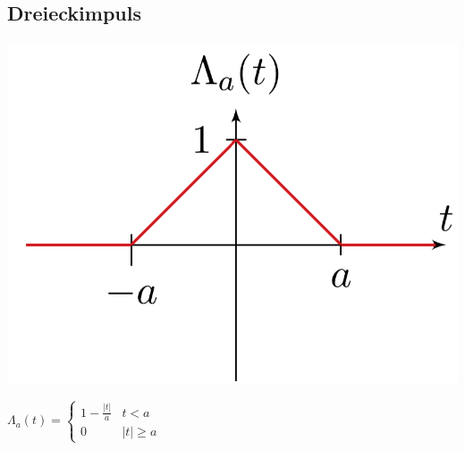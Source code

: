 		\subsection{Dreieckimpuls}
		\begin{minipage}{0.2\textwidth}
			\includegraphics[width=\textwidth]{./bilder/funktionen/dreieckF.png}
		\end{minipage}
		\qquad
		\begin{minipage}{0.45\textwidth}
			$\Lambda_{a}(t)=\begin{cases}{1-\frac{|t|}{a}} & {t<a} \\ {0} & {|t| \geq a}\end{cases}$
		\end{minipage}
		\qquad
		\begin{minipage}{0.25\textwidth}						
		\end{minipage}
		
		
